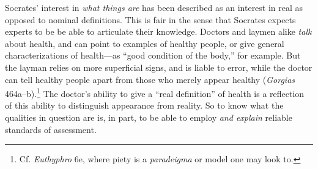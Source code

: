 ﻿\documentclass[11pt]{amsart}
\begin{document}



Socrates' interest in \emph{what things are} has been described as an interest in real as opposed to nominal definitions. This is fair in the sense that Socrates expects experts to be be able to articulate their knowledge. Doctors and laymen alike \emph{talk} about health, and can point to examples of healthy people, or give general characterizations of health---as ``good condition of the body,'' for example. But the layman relies on more superficial signs, and is liable to error, while the doctor can tell healthy people apart from those who merely appear healthy (\emph{Gorgias} 464a--b).\footnote{Cf. \emph{Euthyphro} 6e, where piety is a \emph{paradeigma} or model one may look to.} The doctor's ability to give a ``real definition'' of health is a reflection of this ability to distinguish appearance from reality. So to know what the qualities in question are is, in part, to be able to employ \emph{and explain} reliable standards of assessment. %



\end{document}
